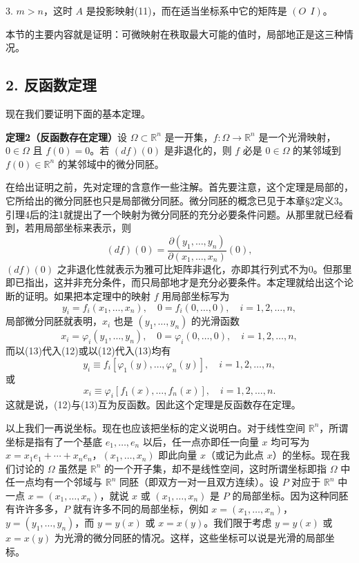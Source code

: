 3. $m>n$，这时 $A$ 是投影映射(11)，而在适当坐标系中它的矩阵是 $(O\ \ I)$。

本节的主要内容就是证明：可微映射在秩取最大可能的值时，局部地正是这三种情况。

\subsection*{2. 反函数定理}

现在我们要证明下面的基本定理。

\noindent\textbf{定理2（反函数存在定理）}\quad 设 $\Omega\subset\mathbb R^n$ 是一开集，$f:\Omega\to\mathbb R^n$ 是一个光滑映射，$0\in\Omega$ 且 $f(0)=0$。若 $(df)(0)$ 是非退化的，则 $f$ 必是 $0\in\Omega$ 的某邻域到 $f(0)\in\mathbb R^n$ 的某邻域中的微分同胚。

在给出证明之前，先对定理的含意作一些注解。首先要注意，这个定理是局部的，它所给出的微分同胚也只是局部微分同胚。微分同胚的概念已见于本章§2定义3。引理4后的注1就提出了一个映射为微分同胚的充分必要条件问题。从那里就已经看到，若用局部坐标来表示，则
\[
 (df)(0)=\frac{\partial(y_1,\ldots,y_n)}{\partial(x_1,\ldots,x_n)}(0),
\]
$(df)(0)$ 之非退化性就表示为雅可比矩阵非退化，亦即其行列式不为0。但那里即已指出，这并非充分条件，而只局部地才是充分必要条件。本定理就给出这个论断的证明。如果把本定理中的映射 $f$ 用局部坐标写为
\begin{equation}
 y_i=f_i(x_1,\ldots,x_n),\quad 0=f_i(0,\ldots,0),\quad i=1,2,\ldots,n,
 \tag{12}
\end{equation}
局部微分同胚就表明，$x_i$ 也是 $(y_1,\ldots,y_n)$ 的光滑函数
\begin{equation}
 x_i=\varphi_i(y_1,\ldots,y_n),\quad 0=\varphi_i(0,\ldots,0),\quad i=1,2,\ldots,n,
 \tag{13}
\end{equation}
而以(13)代入(12)或以(12)代入(13)均有
\[
 y_i\equiv f_i[\varphi_1(y),\ldots,\varphi_n(y)],\quad i=1,2,\ldots,n,
\]
或
\[
 x_i\equiv\varphi_i[f_1(x),\ldots,f_n(x)],\quad i=1,2,\ldots,n.
\]
这就是说，(12)与(13)互为反函数。因此这个定理是反函数存在定理。

以上我们一再说坐标。现在也应该把坐标的定义说明白。对于线性空间 $\mathbb R^n$，所谓坐标是指有了一个基底 $e_1,\ldots,e_n$ 以后，任一点亦即任一向量 $x$ 均可写为 $x=x_1e_1+\cdots+x_ne_n$，$(x_1,\ldots,x_n)$ 即此向量 $x$（或记为此点 $x$）的坐标。现在我们讨论的 $\Omega$ 虽然是 $\mathbb R^n$ 的一个开子集，却不是线性空间，这时所谓坐标即指 $\Omega$ 中任一点均有一个邻域与 $\mathbb R^n$ 同胚（即双方一对一且双方连续）。设 $P$ 对应于 $\mathbb R^n$ 中一点 $x=(x_1,\ldots,x_n)$，就说 $x$ 或 $(x_1,\ldots,x_n)$ 是 $P$ 的局部坐标。因为这种同胚有许许多多，$P$ 就有许多不同的局部坐标，例如 $x=(x_1,\ldots,x_n)$，$y=(y_1,\ldots,y_n)$，而 $y=y(x)$ 或 $x=x(y)$。我们限于考虑 $y=y(x)$ 或 $x=x(y)$ 为光滑的微分同胚的情况。这样，这些坐标可以说是光滑的局部坐标。

